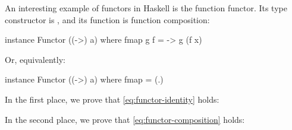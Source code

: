 \begin{example}
  \label{ex:functor-function-haskell}


  An interesting example of functors in Haskell is the function
  functor. Its type constructor is , and its
   function is function composition:
  \begin{codehaskell}
instance Functor ((->) a) where
  fmap g f = \x -> g (f x)
  \end{codehaskell}
  Or, equivalently:
  \begin{codehaskell}
instance Functor ((->) a) where
  fmap = (.)
  \end{codehaskell}


  In the first place, we prove that \eqref{eq:functor-identity} holds:
  \begin{steps}
      \eqby{\eqref{eq:category-identity}}
  \end{steps}
  In the second place, we prove that \eqref{eq:functor-composition}
  holds:
  \begin{steps}
      \eqby{\eqref{eq:category-associativity}}
  \end{steps}

\end{example}


